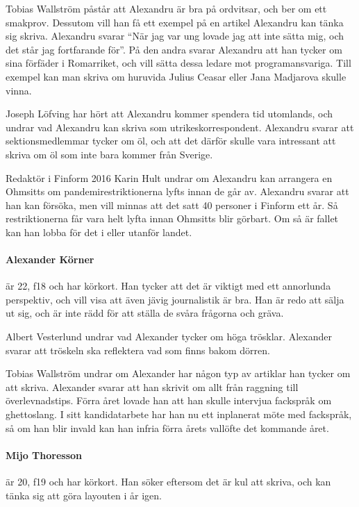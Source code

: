 \documentclass[hidelinks]{sektionsmote}
\begin{document}
Tobias Wallström påstår att Alexandru är bra på ordvitsar, och ber om ett smakprov.
Dessutom vill han få ett exempel på en artikel Alexandru kan tänka sig skriva.
Alexandru svarar \enquote{När jag var ung lovade jag att inte sätta mig, och det står jag fortfarande för}.
På den andra svarar Alexandru att han tycker om sina förfäder i Romarriket, och vill sätta dessa ledare mot programansvariga.
Till exempel kan man skriva om huruvida Julius Ceasar eller Jana Madjarova skulle vinna.

Joseph Löfving har hört att Alexandru kommer spendera tid utomlands, och undrar vad Alexandru kan skriva som utrikeskorrespondent.
Alexandru svarar att sektionsmedlemmar tycker om öl, och att det därför skulle vara intressant att skriva om öl som inte bara kommer från  Sverige.

Redaktör i Finform 2016 Karin Hult undrar om Alexandru kan arrangera en Ohmsitts om pandemirestriktionerna lyfts innan de går av.
Alexandru svarar att han kan försöka, men vill minnas att det satt 40 personer i Finform ett år.
Så restriktionerna får vara helt lyfta innan Ohmsitts blir görbart.
Om så är fallet kan han lobba för det i eller utanför landet.

\paragraph{Alexander Körner} är 22, f18 och har körkort.
Han tycker att det är viktigt med ett annorlunda perspektiv, och vill visa att även jävig journalistik är bra.
Han är redo att sälja ut sig, och är inte rädd för att ställa de svåra frågorna och gräva.

Albert Vesterlund undrar vad Alexander tycker om höga trösklar.
Alexander svarar att tröskeln ska reflektera vad som finns bakom dörren.

Tobias Wallström undrar om Alexander har någon typ av artiklar han tycker om att skriva.
Alexander svarar att han skrivit om allt från raggning till överlevnadstips.
Förra året lovade han att han skulle intervjua fackspråk om ghettoslang.
I sitt kandidatarbete har han nu ett inplanerat möte med fackspråk, så om han blir invald kan han infria förra årets vallöfte det kommande året.

\paragraph{Mijo Thoresson} är 20, f19 och har körkort.
Han söker eftersom det är kul att skriva, och kan tänka sig att göra layouten i år igen.
\end{document}
